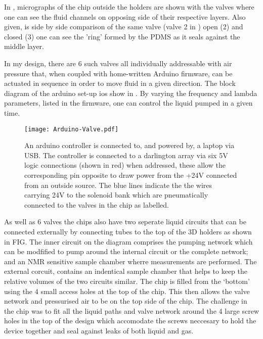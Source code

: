 In , micrographs of the chip outside the holders are shown with the valves where one can see the fluid channels on opposing side of their respective layers. Also given, is side by side comparison of the same valve (valve 2 in ) open (2) and closed (3) one can see the 'ring' formed by the PDMS as it seals against the middle layer.

In my design, there are 6 such valves all individually addressable with air pressure that, when
coupled with home-written Arduino firmware, can be actuated in sequence in order to move
fluid in a given direction. The block diagram of the arduino set-up ios show in
. By varying the frequency and lambda parameters, listed in the
firmware, one can control the liquid pumped in a given time.

\begin{figure}
  \begin{center}
  \texttt{[image: Arduino-Valve.pdf]}
  \end{center}
  \caption{An arduino controller is connected to, and powered by, a laptop via USB. The controller is connected
  to a darlington array via six 5V logic connections (shown in red) when addressed, these allow the corresponding pin
  opposite to draw power from the +24V connected from an outside source. The blue lines indicate the the wires
  carrying 24V to the solenoid bank which are pneumatically connected to the valves in the chip as labelled. }
  \label{fig:ValveSetup}
\end{figure}

As well as 6 valves the chips also have two seperate liquid
circuits that can be connected externally by connecting tubes to the top of the 3D
holders as shown in FIG. The inner circuit on
the diagram comprises the pumping network which can be
modfified to pump around the internal circuit or the complete network; and an NMR
sensitive sample chamber wherre measurements are performed. The external corcuit,
contains an indentical sample chamber that helps to keep the relative
volumes of the two circuits similar. The chip is filled from the
‘bottom’ using the 4 small access holes at the top of the chip.
This then allows the valve network and pressurised air to be
on the top side of the chip. The challenge in the chip was to fit
all the liquid paths and valve network around the 4 large screw
holes in the top of the design which accomodate the screws
neccesary to hold the device together and seal against leaks of
both liquid and gas.


